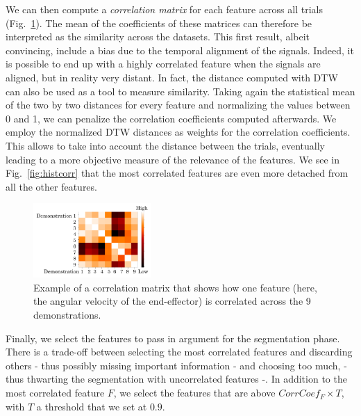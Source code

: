 \documentclass[a4paper, 10pt, conference]{ieeeconf}
\begin{document}
We can then compute a \textit{correlation matrix} for each feature across all trials (Fig.~\ref{fig:corrMat}). The mean of the coefficients of these matrices can therefore be interpreted as the similarity across the datasets. This first result, albeit convincing, include a bias due to the temporal alignment of the signals. Indeed, it is possible to end up with a highly correlated feature when the signals are aligned, but in reality very distant. In fact, the distance computed with DTW can also be used as a tool to measure similarity. Taking again the statistical mean of the two by two distances for every feature and normalizing the values between 0 and 1, we can penalize the correlation coefficients computed afterwards. We employ the normalized DTW distances as weights for the correlation coefficients. This allows to take into account the distance between the trials, eventually leading to a more objective measure of the relevance of the features. We see in Fig.~\ref{fig:histcorr} that the most correlated features are even more detached from all the other features.  

\begin{figure}[t]
  \centering
  \includegraphics[width=0.4\textwidth]{img/resolCorrMap.pdf}
  \caption{Example of a correlation matrix that shows how one feature (here, the angular velocity of the end-effector) is correlated across the 9 demonstrations.}
  \label{fig:corrMat}
\end{figure}

Finally, we select the features to pass in argument for the segmentation phase. There is a trade-off between selecting the most correlated features and discarding others - thus possibly missing important information - and choosing too much, - thus thwarting the segmentation with uncorrelated features -. In  addition to the most correlated feature $F$, we select the features that are above $CorrCoef_{F} \times T$, with $T$ a threshold that we set at $0.9$. \newline
\end{document}
